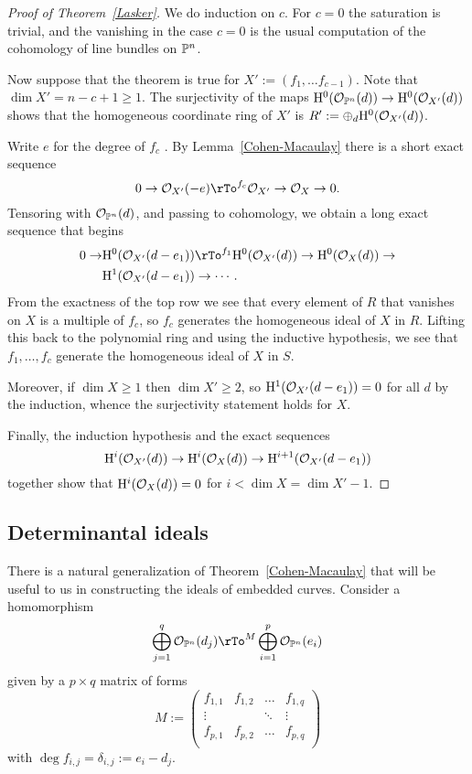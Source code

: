 \begin{proof} [Proof of Theorem~\ref{Lasker}] We do induction on $c$. For $c=0$ the saturation is trivial, and the vanishing in the case $c=0$ is the usual computation of the cohomology of line bundles on $\PP^{n}$. 

Now suppose that the theorem is true for $X' := (f_{1}, \dots f_{c-1})$. Note that $\dim X' = n-c+1\geq 1$.
 The surjectivity of 
the maps $\HH^{0}(\cO_{\PP^{n}}(d)) \to \HH^{0}(\cO_{X'}(d))$ shows that the homogeneous coordinate ring
of $X'$ is $R':=\oplus_{d} \HH^{0}(\cO_{X'}(d))$.

Write $e$ for the degree of $f_{c}$ . By Lemma~\ref{Cohen-Macaulay} there is a short
exact sequence
$$
0\to \cO_{X'}(-e) \rTo^{f_{c}} \cO_{X'} \to \cO_{X} \to 0.
$$
Tensoring with $\cO_{\PP^{n}}(d)$, and passing to cohomology, we obtain a long exact sequence that begins
\begin{align*}
0\to &\HH^{0}(\cO_{X'}(d-e_{1})) \rTo^{f_{1}}  \HH^{0}(\cO_{X'}(d)) \to  \HH^{0}(\cO_{X}(d))\to\\
&\HH^{1}(\cO_{X'}(d-e_{1}))\to \cdots .
\end{align*}
From the exactness of the top row we see that every element of $R$ 
that vanishes on $X$ is a multiple of $f_{c}$, so $f_{c}$ generates the homogeneous ideal of $X$ in $R$.
Lifting this back to the polynomial ring and using
 the inductive hypothesis, we see that $f_{1},\dots, f_{c}$ generate the homogeneous ideal of
$X$ in $S$.

Moreover, if $\dim X\geq 1$ then $\dim X' \geq 2$, so $\HH^{1}(\cO_{X'}(d-e_{1})) = 0$ for all $d$ by the induction,
whence the surjectivity statement holds for $X$.

Finally, the induction hypothesis and the exact sequences
$$
\HH^{i}(\cO_{X'}(d)) \to  \HH^{i}(\cO_{X}(d))\to \HH^{i+1}(\cO_{X'}(d-e_{1}))
$$
together show that $\HH^{i}(\cO_{X}(d)) = 0$ for $i<\dim X = \dim X'-1$.

\end{proof}

\subsection{Determinantal ideals}
There is a natural generalization of Theorem~\ref{Cohen-Macaulay} that will be useful to us in constructing the 
ideals of embedded curves.  Consider a homomorphism
$$
\bigoplus_{j=1}^{q}\cO_{\PP^{n}}(d_{j}) \rTo^{M}
\bigoplus_{i=1}^{p}\cO_{\PP^{n}}(e_{i})
$$
given by a 
 $p\times q$ matrix of forms
$$
M:=\begin{pmatrix}
 f_{1,1}&f_{1,2}&\dots&f_{1,q}\\
\vdots&&\ddots&\vdots\\
f_{p,1}&f_{p,2}&\dots&f_{p,q}\\
\end{pmatrix}
$$
with $\deg f_{i,j} = \delta_{i,j} := e_{i}-d_{j}$. 

